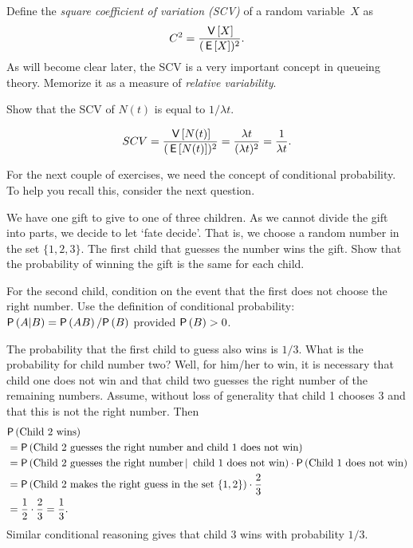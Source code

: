 Define the \emph{square coefficient  of variation (SCV)} of a random variable~$X$ as 
\begin{equation}\label{eq:62}
  C^2= \frac{\,\mathsf{V}\left[X\right]}{(\,\mathsf{E}\left[X\right])^2}.
\end{equation}
As  will become clear later, the SCV is a very important concept in
  queueing theory. Memorize it as a measure of \emph{relative
  variability}.

\begin{exercise}
Show that   the SCV of $N(t)$ is equal to $1/\lambda t$. 
  \begin{solution}
    \begin{equation*}
SCV = \frac{\,\mathsf{V}\left[N(t)\right]}{(\,\mathsf{E}\left[N(t)\right])^2} = \frac{\lambda t}{(\lambda t)^2} = \frac1{\lambda t}.
    \end{equation*}

  \end{solution}
\end{exercise}

For the next couple of exercises, we need the concept of conditional probability. To help you recall this, consider the next question.

\begin{exercise} \label{ex:18}
  We have  one gift to give to one of three children. As we cannot
  divide the gift into parts, we decide to let `fate decide'. That
  is, we choose a random number in the set $\{1, 2, 3\}$. The first
  child that guesses the number wins the gift. Show that the
  probability of winning the gift is the same for each child.
  \begin{hint}
    For the second child, condition on the event that the first does not choose the right number.
    Use the definition of conditional probability:
    $\P{A|B} = \P{AB}/\P{B}$ provided $\P{B}>0$.
  \end{hint}
\begin{solution}
    The probability that the first child to guess also wins is
    $1/3$. What is the probability for child number two? Well, for
    him/her to win, it is necessary that child one does not win and
    that child two guesses the right number of the remaining
    numbers. Assume, without loss of generality that child 1 chooses
    $3$ and that this is not the right number. Then 
    \begin{equation*}
      \begin{split}
&\P{\text{Child  2 wins}} \\
&= \P{\text{Child 2 guesses the right number and child 1 does not win}} \\
&= \P{\text{Child 2 guesses the right number} \given \text{ child 1 does not win}}
\cdot \P{\text{Child 1 does not win}} \\
&= \P{\text{Child 2 makes the right guess in the set $\{1,2\}$}}\cdot \frac 23 \\
&= \frac 1 2\cdot \frac 23  = \frac 1 3.
      \end{split}
    \end{equation*}
    Similar conditional reasoning gives that child 3 wins with probability $1/3$. 
  \end{solution}
\end{exercise}

